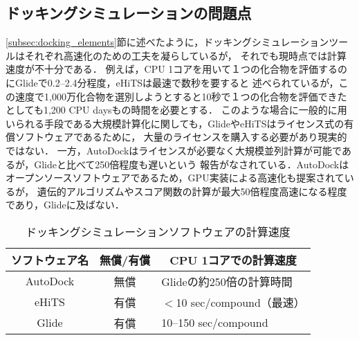 
\subsection{ドッキングシミュレーションの問題点}\label{subsec:docking_problem}
\ref{subsec:docking_elements}節に述べたように，ドッキングシミュレーションツールはそれぞれ高速化のための工夫を凝らしているが，
それでも現時点では計算速度が不十分である．
例えば，CPU 1コアを用いて１つの化合物を評価するのにGlideで0.2--2.4分程度\cite{Friesner2004}，eHiTSは最速で数秒\cite{Zsoldos2007}を要すると
述べられているが，この速度で1,000万化合物を選別しようとすると10秒で１つの化合物を評価できたとしても1,200 CPU daysもの時間を必要とする．
このような場合に一般的に用いられる手段である大規模計算化に関しても，GlideやeHiTSはライセンス式の有償ソフトウェアであるために，
大量のライセンスを購入する必要があり現実的ではない．
一方，AutoDockはライセンスが必要なく大規模並列計算が可能であるが，Glideと比べて250倍程度も遅いという
報告がなされている\cite{Tuccinardi2010}．AutoDockはオープンソースソフトウェアであるため，GPU実装による高速化も提案されているが，
遺伝的アルゴリズムやスコア関数の計算が最大50倍程度高速になる程度であり\cite{Kannan2010}，Glideに及ばない．

\begin{table}[htb] \centering
	\caption{ドッキングシミュレーションソフトウェアの計算速度}
	\label{table:docking_tools}
	\begin{tabular}{c|cl}
	\hline
	ソフトウェア名					&無償/有償				&\multicolumn{1}{c}{CPU 1コアでの計算速度} 					\\ 
	\hline
	AutoDock					&無償						&Glideの約250倍の計算時間\cite{Tuccinardi2010}		\\ 
	eHiTS							&有償						&$<$10 sec/compound（最速）\cite{Zsoldos2007}			\\
	Glide							&有償						&10--150 sec/compound\cite{Friesner2004}				\\
	\hline
	\end{tabular}
\end{table}

